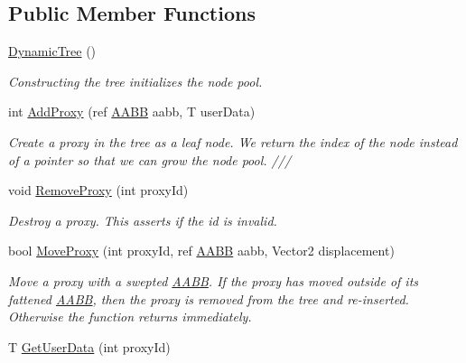 \subsection*{Public Member Functions}
\begin{DoxyCompactItemize}
\item 
\hyperlink{class_farseer_physics_1_1_collision_1_1_dynamic_tree_3_01_t_01_4_ad5230c2d3a9d3f011aa4e0006b1b1507}{Dynamic\+Tree} ()
\begin{DoxyCompactList}\small\item\em Constructing the tree initializes the node pool. \end{DoxyCompactList}\item 
int \hyperlink{class_farseer_physics_1_1_collision_1_1_dynamic_tree_3_01_t_01_4_a6258a0d5d391d608e28c3ea633430c2f}{Add\+Proxy} (ref \hyperlink{struct_farseer_physics_1_1_collision_1_1_a_a_b_b}{A\+A\+B\+B} aabb, T user\+Data)
\begin{DoxyCompactList}\small\item\em Create a proxy in the tree as a leaf node. We return the index of the node instead of a pointer so that we can grow the node pool. /// \end{DoxyCompactList}\item 
void \hyperlink{class_farseer_physics_1_1_collision_1_1_dynamic_tree_3_01_t_01_4_a1e2c77dfe2725347758b81aa87e0ca8b}{Remove\+Proxy} (int proxy\+Id)
\begin{DoxyCompactList}\small\item\em Destroy a proxy. This asserts if the id is invalid. \end{DoxyCompactList}\item 
bool \hyperlink{class_farseer_physics_1_1_collision_1_1_dynamic_tree_3_01_t_01_4_aae3d90dac1bea339e1002c4a1c111660}{Move\+Proxy} (int proxy\+Id, ref \hyperlink{struct_farseer_physics_1_1_collision_1_1_a_a_b_b}{A\+A\+B\+B} aabb, Vector2 displacement)
\begin{DoxyCompactList}\small\item\em Move a proxy with a swepted \hyperlink{struct_farseer_physics_1_1_collision_1_1_a_a_b_b}{A\+A\+B\+B}. If the proxy has moved outside of its fattened \hyperlink{struct_farseer_physics_1_1_collision_1_1_a_a_b_b}{A\+A\+B\+B}, then the proxy is removed from the tree and re-\/inserted. Otherwise the function returns immediately. \end{DoxyCompactList}\item 
T \hyperlink{class_farseer_physics_1_1_collision_1_1_dynamic_tree_3_01_t_01_4_a866de9ad01d28c5ca35cc3d6e3d6b97c}{Get\+User\+Data} (int proxy\+Id)

\end{DoxyCompactItemize}
